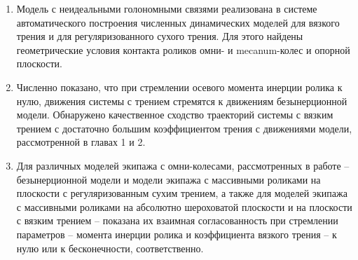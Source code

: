 \begin{enumerate}
        \item {
            Модель с неидеальными голономными связями реализована в системе автоматического построения численных динамических моделей для вязкого трения и для регуляризованного сухого трения. Для этого найдены геометрические условия контакта роликов омни- и mecanum-колес и опорной плоскости.
        }

        \item {
            Численно показано, что при стремлении осевого момента инерции ролика к нулю, движения системы с трением стремятся к движениям безынерционной модели. Обнаружено качественное сходство траекторий системы с вязким трением с достаточно большим коэффициентом трения с движениями модели, рассмотренной в главах 1 и 2.
        }

        \item {
            Для различных моделей экипажа с омни-колесами, рассмотренных в работе -- безынерционной модели и модели экипажа с массивными роликами на плоскости с регуляризованным сухим трением, а также для моделей экипажа с массивными роликами на абсолютно шероховатой плоскости и на плоскости с вязким трением -- показана их взаимная согласованность
            при стремлении параметров -- момента инерции ролика и коэффициента вязкого трения -- к нулю или к бесконечности, соответственно.
        }
        




\end{enumerate}
